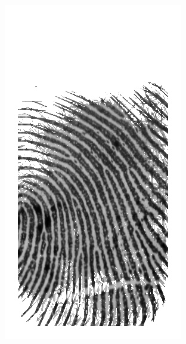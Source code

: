 \documentclass{beamer}
\begin{document}
{\begin{figure}[!ht]
\begin{subfigure}[ht]{0.15\textwidth}
            \includegraphics[width=\textwidth]{fingerprints/2002Db2a/1_1_filtered.jpg}
        \end{subfigure}
    \end{figure}
    \begin{figure}[!ht]
        \centering
        \begin{subfigure}[ht]{0.15\textwidth}

\end{subfigure}
\end{figure}}
\end{document}
